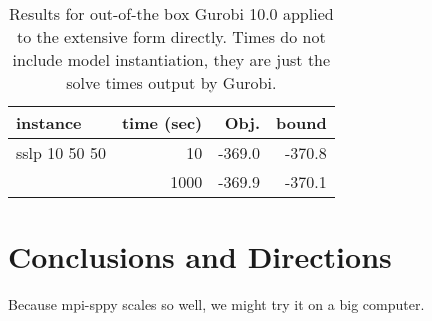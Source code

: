 \documentclass{article}
\begin{document}
\begin{table}
\begin{tabular}{lrrr}
\hline\hline
instance & time (sec) &   Obj.  & bound \\
\hline
sslp 10 50 50 & 10 & -369.0 & -370.8 \\
              & 1000 & -369.9 & -370.1 \\


\hline\hline
\end{tabular}
\caption{Results for out-of-the box Gurobi 10.0 applied to the extensive form directly. Times do not include model instantiation, they are just the solve times output by Gurobi.\label{tab:ef}}
\end{table}


\section{Conclusions and Directions}

Because mpi-sppy scales so well, we might try it on a big computer.



\end{document}
